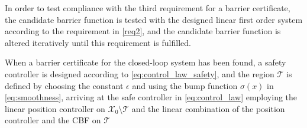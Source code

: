In order to test compliance with the third requirement for a barrier certificate, the candidate barrier function is tested with the designed linear first order system according to the requirement in \autoref{req2}, and the candidate barrier function is altered iteratively until this requirement is fulfilled.

When a barrier certificate for the closed-loop system has been found, a safety controller is designed according to \autoref{eq:control_law_safety}, and the region $\mathcal{T}$ is defined by choosing the constant $\epsilon$ and using the bump function $\sigma(x)$ in \autoref{eq:smoothness}, arriving at the safe controller in \autoref{eq:control_law} employing the linear position controller on $\mathcal{X}_0\setminus\mathcal{T}$ and the linear combination of the position controller and the CBF on $\mathcal{T}$


